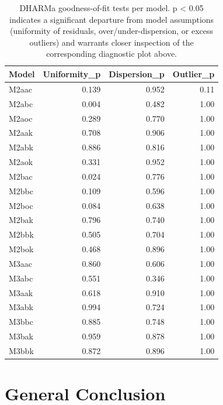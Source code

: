 \documentclass[
  12pt,
  a4paper,
  oneside]{scrbook}
\begin{document}
{

\begin{longtable}[]{@{}lrrr@{}}

\caption{\label{tbl-residual-diagnostics-supp}DHARMa goodness-of-fit
tests per model. p \textless{} 0.05 indicates a significant departure
from model assumptions (uniformity of residuals, over/under-dispersion,
or excess outliers) and warrants closer inspection of the corresponding
diagnostic plot above.}

\tabularnewline

\toprule\noalign{}
Model & Uniformity\_p & Dispersion\_p & Outlier\_p \\
\midrule\noalign{}
\endhead
\bottomrule\noalign{}
\endlastfoot
M2aac & 0.139 & 0.952 & 0.11 \\
M2abc & 0.004 & 0.482 & 1.00 \\
M2aoc & 0.289 & 0.770 & 1.00 \\
M2aak & 0.708 & 0.906 & 1.00 \\
M2abk & 0.886 & 0.816 & 1.00 \\
M2aok & 0.331 & 0.952 & 1.00 \\
M2bac & 0.024 & 0.776 & 1.00 \\
M2bbc & 0.109 & 0.596 & 1.00 \\
M2boc & 0.084 & 0.638 & 1.00 \\
M2bak & 0.796 & 0.740 & 1.00 \\
M2bbk & 0.505 & 0.704 & 1.00 \\
M2bok & 0.468 & 0.896 & 1.00 \\
M3aac & 0.860 & 0.606 & 1.00 \\
M3abc & 0.551 & 0.346 & 1.00 \\
M3aak & 0.618 & 0.910 & 1.00 \\
M3abk & 0.994 & 0.724 & 1.00 \\
M3bbc & 0.885 & 0.748 & 1.00 \\
M3bak & 0.959 & 0.878 & 1.00 \\
M3bbk & 0.872 & 0.896 & 1.00 \\

\end{longtable}

}


\chapter{General Conclusion}\label{general-conclusion}
\end{document}

